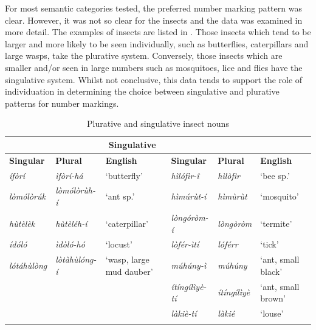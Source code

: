 \documentclass[output=paper]{langsci/langscibook}
\begin{document}
For most semantic categories tested, the preferred number marking pattern was clear. However, it was not so clear for the insects and the data was examined in more detail. The examples of insects are listed in . Those insects which tend to be larger and more likely to be seen individually, such as butterflies, caterpillars and large wasps, take the plurative system. Conversely, those insects which are smaller and/or seen in large numbers such as mosquitoes, lice and flies have the singulative system. Whilst not conclusive, this data tends to support the role of individuation in determining the choice between singulative and plurative patterns for number markings.

\begin{table}
\begin{tabularx}{\textwidth}{llXllX}
\lsptoprule

\multicolumn{3}{c}{\textbf{Plurative}} & \multicolumn{3}{c}{\textbf{Singulative}}\\ \midrule
 \textbf{Singular} & \textbf{Plural} & \textbf{English} & \textbf{Singular} & \textbf{Plural} & \textbf{English}\\ \midrule
\itshape \'{i}f\`{o}r\'{i} & \itshape \`{i}f\`{o}r\'{i}-h\'{a} & ‘butterfly’ & \itshape h\`{i}l\'{o}f\`{i}r-\^{i} & \itshape h\`{i}l\`{o}f\`{i}r & ‘bee sp.’\\
\itshape l\`{o}m\'{o}l\`{o}r\'{u}k & \itshape l\`{o}m\'{o}l\`{o}r\`{u}h-\'{i} & ‘ant sp.’ & \itshape h\`{i}m\'{u}r\`{u}t-\'{i} & \itshape h\`{i}m\`{u}r\`{u}t & ‘mosquito’\\
\itshape h\`{u}t\`{e}l\`{e}k & \itshape h\`{u}t\`{e}l\'{e}h-\'{i} & ‘caterpillar’ & \itshape l\`{o}ng\'{o}r\`{o}m-\'{i} & \itshape l\`{o}ng\`{o}r\`{o}m & ‘termite’\\
\itshape \'{i}d\'{o}l\'{o} & \itshape \`{i}d\`{o}l\'{o}-h\'{o} & ‘locust’ & \itshape l\`{o}f\'{e}r-\`{i}t\'{i} & \itshape l\'{o}f\'{e}rr & ‘tick’\\
\itshape l\'{o}t\'{a}h\`{u}l\`{o}ng & \itshape l\`{o}t\`{a}h\`{u}l\'{o}ng-\'{i} & ‘wasp, large mud dauber’ & \itshape m\'{u}h\'{u}ny-\`{i} & \itshape m\'{u}h\'{u}ny & ‘ant, small black’\\
&  &  & \itshape \'{i}t\'{i}ng\'{i}l\`{i}y\`{e}-t\'{i} & \itshape \'{i}t\'{i}ng\'{i}l\`{i}y\`{e} & ‘ant, small brown’\\
&  &  & \itshape l\`{a}ki\`{e}-t\'{i} & \itshape l\`{a}ki\'{e} & ‘louse’\\
\lspbottomrule
\end{tabularx}
\caption{Plurative and singulative insect nouns}
\label{tab:moodie:7}
\end{table}
\end{document}
